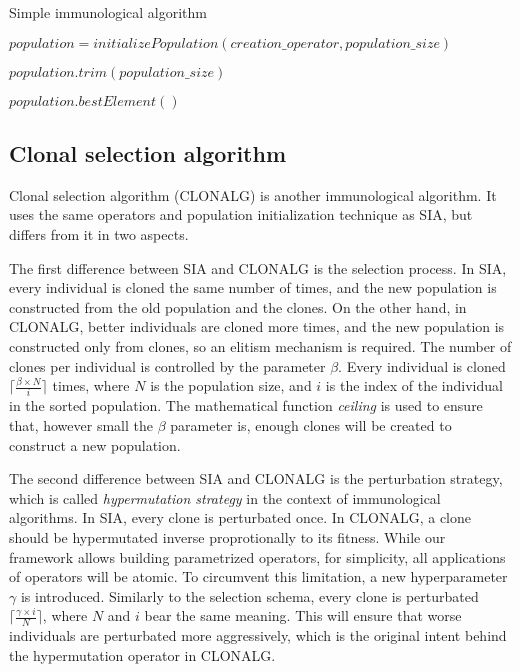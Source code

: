 \begin{algorithm}[!htbp]
    \caption{Simple immunological algorithm}
    \label{alg:sia}

    $population = initializePopulation(creation\_operator, population\_size)$\;

     {
        $population.trim(population\_size)$\;
    }

    \Return $population.bestElement()$\;
    \end{algorithm}

\subsection{Clonal selection algorithm}
\label{sec:clonalg}

Clonal selection algorithm (CLONALG) \citep{clonalg} is another immunological algorithm. It uses the same operators and population initialization technique as SIA, but differs from it in two aspects. 

The first difference between SIA and CLONALG is the selection process. In SIA, every individual is cloned the same number of times, and the new population is constructed from the old population and the clones. On the other hand, in CLONALG, better individuals are cloned more times, and the new population is constructed only from clones, so an elitism mechanism is required. The number of clones per individual is controlled by the parameter $\beta$. Every individual is cloned $\lceil \frac{\beta \times N}{i} \rceil$ times, where $N$ is the population size, and $i$ is the index of the individual in the sorted population. The mathematical function \textit{ceiling} is used to ensure that, however small the $\beta$ parameter is, enough clones will be created to construct a new population.

The second difference between SIA and CLONALG is the perturbation strategy, which is called \textit{hypermutation strategy} in the context of immunological algorithms. In SIA, every clone is perturbated once. In CLONALG, a clone should be hypermutated inverse proprotionally to its fitness. While our framework allows building parametrized operators, for simplicity, all applications of operators will be atomic. To circumvent this limitation, a new hyperparameter $\gamma$ is introduced. Similarly to the selection schema, every clone is perturbated $\lceil \frac{\gamma \times i}{N} \rceil$, where $N$ and $i$ bear the same meaning. This will ensure that worse individuals are perturbated more aggressively, which is the original intent behind the hypermutation operator in CLONALG.

